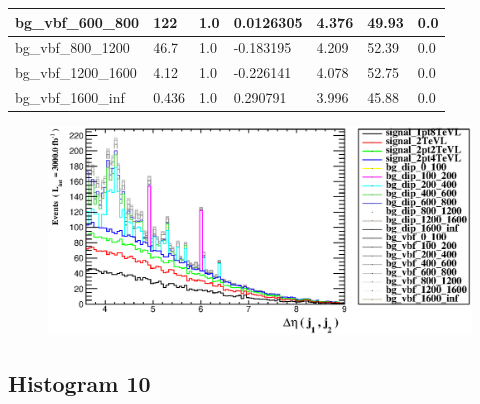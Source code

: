 \documentclass[a4paper, 10pt]{article}
\begin{document}
\begin{table}[H]
\begin{center}
\begin{tabular}{|m{23.0mm}|m{23.0mm}|m{18.0mm}|m{19.0mm}|m{19.0mm}|m{19.0mm}|m{19.0mm}|}
      \hline
      {\cellcolor{white}         bg\_vbf\_600\_800}& {\cellcolor{white}         122}& {\cellcolor{white}         1.0}& {\cellcolor{white}         0.0126305}& {\cellcolor{white}         4.376}& {\cellcolor{red}         49.93}& {\cellcolor{red}         0.0}\\
      \hline
      {\cellcolor{white}         bg\_vbf\_800\_1200}& {\cellcolor{white}         46.7}& {\cellcolor{white}         1.0}& {\cellcolor{white}         -0.183195}& {\cellcolor{white}         4.209}& {\cellcolor{red}         52.39}& {\cellcolor{red}         0.0}\\
      \hline
      {\cellcolor{white}         bg\_vbf\_1200\_1600}& {\cellcolor{white}         4.12}& {\cellcolor{white}         1.0}& {\cellcolor{white}         -0.226141}& {\cellcolor{white}         4.078}& {\cellcolor{red}         52.75}& {\cellcolor{red}         0.0}\\
      \hline
      {\cellcolor{white}         bg\_vbf\_1600\_inf}& {\cellcolor{white}         0.436}& {\cellcolor{white}         1.0}& {\cellcolor{white}         0.290791}& {\cellcolor{white}         3.996}& {\cellcolor{red}         45.88}& {\cellcolor{red}         0.0}\\
\hline
    \end{tabular}
  \end{center}
\end{table}

\begin{figure}[H]
  \begin{center}
    \includegraphics[scale=0.45]{selection_8.eps}\\
\caption{   }
  \end{center}
\end{figure}
      \newpage
\subsection{ Histogram 10}
\end{document}
